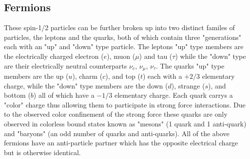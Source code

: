 \subsection{Fermions} \label{sec:theory:fermions}

These spin-1/2 particles can be further broken up into two distinct familes of
particles, the leptons and the quarks, both of which contain three "generations"
each with an "up" and "down" type particle.  The leptons "up" type members are
the electrically charged electron ($e$), muon ($\mu$) and tau ($\tau$) while the
"down" type are their electrically neutral counterparts $\nu_e$, $\nu_\mu$,
$\nu_\tau$. The quarks "up" type members are the up ($u$), charm ($c$), and top
($t$) each with a $+2/3$ elementary charge, while the "down" type members are
the down ($d$), strange ($s$), and bottom ($b$) all of which have a $-1/3$
elementary charge.  Each quark carrys a "color" charge thus allowing them to
participate in strong force interactions.  Due to the observed color confinement
of the strong force these quarks are only observed in colorless bound states
known as "mesons" (1 quark and 1 anti-quark) and "baryons" (an odd number of
quarks and anti-quarks).  All of the above fermions have an anti-particle
partner which has the opposite electrical charge but is otherwise identical.
